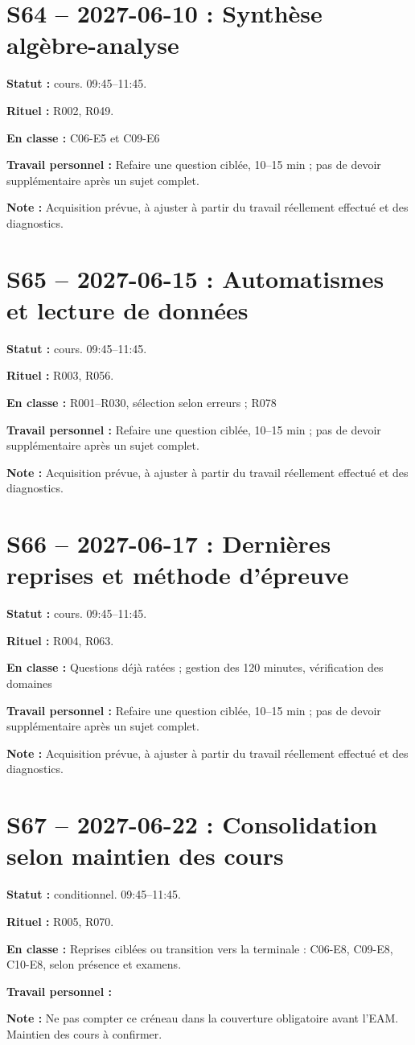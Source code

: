 \section*{S64 -- 2027-06-10 : Synthèse algèbre-analyse}
\textbf{Statut :} cours. 09:45–11:45.\par\textbf{Rituel :} R002, R049.\par\textbf{En classe :} C06-E5 et C09-E6\par\textbf{Travail personnel :} Refaire une question ciblée, 10–15 min ; pas de devoir supplémentaire après un sujet complet.\par\textbf{Note :} Acquisition prévue, à ajuster à partir du travail réellement effectué et des diagnostics.
\section*{S65 -- 2027-06-15 : Automatismes et lecture de données}
\textbf{Statut :} cours. 09:45–11:45.\par\textbf{Rituel :} R003, R056.\par\textbf{En classe :} R001–R030, sélection selon erreurs ; R078\par\textbf{Travail personnel :} Refaire une question ciblée, 10–15 min ; pas de devoir supplémentaire après un sujet complet.\par\textbf{Note :} Acquisition prévue, à ajuster à partir du travail réellement effectué et des diagnostics.
\section*{S66 -- 2027-06-17 : Dernières reprises et méthode d’épreuve}
\textbf{Statut :} cours. 09:45–11:45.\par\textbf{Rituel :} R004, R063.\par\textbf{En classe :} Questions déjà ratées ; gestion des 120 minutes, vérification des domaines\par\textbf{Travail personnel :} Refaire une question ciblée, 10–15 min ; pas de devoir supplémentaire après un sujet complet.\par\textbf{Note :} Acquisition prévue, à ajuster à partir du travail réellement effectué et des diagnostics.
\section*{S67 -- 2027-06-22 : Consolidation selon maintien des cours}
\textbf{Statut :} conditionnel. 09:45–11:45.\par\textbf{Rituel :} R005, R070.\par\textbf{En classe :} Reprises ciblées ou transition vers la terminale : C06-E8, C09-E8, C10-E8, selon présence et examens.\par\textbf{Travail personnel :} \par\textbf{Note :} Ne pas compter ce créneau dans la couverture obligatoire avant l’EAM. Maintien des cours à confirmer.
